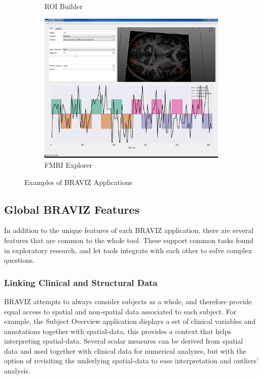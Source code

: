 \documentclass[twocolumn]{svjour3}
\begin{document}
\begin{figure}
\begin{center}
\begin{subfigure}[b]{0.22\linewidth}
\caption{ROI Builder\label{fig_roi}}
\end{subfigure}\hfill
\begin{subfigure}[b]{0.18\linewidth}
\includegraphics[width=\textwidth]{figures/fmri}
\caption{FMRI Explorer\label{fig_fmri}}
\end{subfigure}
\end{center}
 \caption{\label{fig_other_apps} Examples of BRAVIZ Applications}
\end{figure}



\subsection{Global BRAVIZ Features}

In addition to the unique features of each BRAVIZ application, there are several features that are common to the whole tool. These support common tasks found in exploratory research, and let tools integrate with each other to solve complex questions.

\subsubsection{Linking Clinical and Structural Data}

BRAVIZ attempts to always consider subjects as a whole, and therefore provide equal access to spatial and non-spatial data associated to each subject. For example, the Subject Overview application displays a set of clinical variables and annotations together with spatial-data, this provides a context that helps interpreting spatial-data. Several scalar measures can be derived from spatial data and used together with clinical data for numerical analyzes, but with the option of revisiting the underlying spatial-data to ease interpretation and outliers' analysis.
\end{document}
